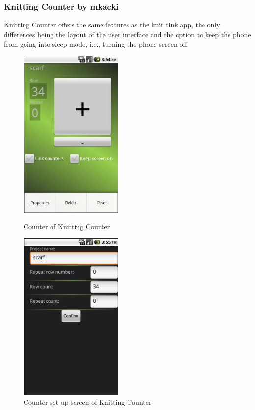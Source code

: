 \subsubsection*{Knitting Counter by mkacki}
Knitting Counter offers the same features as the knit tink app, the only differences being the layout of the user interface and the option to keep the phone from going into sleep mode, i.e., turning the phone screen off.

\begin{figure}[H]
\centering
\begin{minipage}{.5\textwidth}
  \centering
  \includegraphics[width=2in]{images/image12.png}
  \caption[Counter of Knitting Counter ]{Counter of Knitting Counter}
  \label{fig_knittingcounter1}
\end{minipage}%
\begin{minipage}{.5\textwidth}
  \centering
  \includegraphics[width=2in]{images/image06.png}
  \caption[Counter set up screen of Knitting Counter ] {Counter set up screen of Knitting Counter}
  \label{fig_knittingcounter2}
\end{minipage}
\end{figure}

